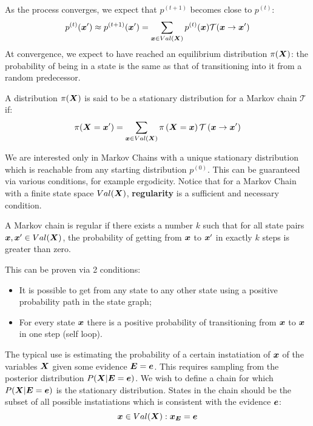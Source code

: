 As the process converges, we expect that $p^{(t+1)}$ becomes close to $p^{(t)}$:
\[p^{(t)}(\bm{x}')\approx p^{(t+1)}(\bm{x}')=\displaystyle\sum_{\bm{x}\in Val(\bm{X})}p^{(t)}(\bm{x})\mathcal{T}(\bm{x}\rightarrow\bm{x}')\]
At convergence, we expect to have reached an equilibrium distribution $\pi(\bm{X})$: the probability of being in a state is the same as that of transitioning into it from a random predecessor.
\begin{definition}
  A distribution $\pi(\bm{X})$ is said to be a stationary distribution for a Markov chain $\mathcal{T}$ if:
  \[\pi(\bm{X}=\bm{x}')=\displaystyle\sum_{\bm{x}\in Val(\bm{X})}\pi\left(\bm{X}=\bm{x}\right)\mathcal{T}\left(\bm{x}\rightarrow\bm{x}'\right)\]
\end{definition}
We are interested only in Markov Chains with a unique stationary distribution which is reachable from any starting distribution $p^{(0)}$. This can be guaranteed via various conditions, for example ergodicity. Notice that for a Markov Chain with a finite state space $Val(\bm{X})$, \textbf{regularity} is a sufficient and necessary condition. 
\begin{definition}[Regularity]
  A Markov chain is regular if there exists a number $k$ such that for all state pairs $\bm{x},\bm{x}'\in Val(\bm{X})$, the probability of getting from $\bm{x}$ to $\bm{x}'$ in exactly $k$ steps is greater than zero.  
\end{definition}
This can be proven via 2 conditions:
\begin{itemize}
  \item It is possible to get from any state to any other state using a positive probability path in the state graph;
  \item For every state $\bm{x}$ there is a positive probability of transitioning from $\bm{x}$ to $\bm{x}$ in one step (self loop).
\end{itemize}
The typical use is estimating the probability of a certain instatiation of $\bm{x}$ of the variables $\bm{X}$ given some evidence $\bm{E}=\bm{e}$. This requires sampling from the posterior distribution $P(\bm{X}\vert\bm{E}=\bm{e})$. We wish to define a chain for which $P(\bm{X}\vert\bm{E}=\bm{e})$ is the stationary distribution. \newline
States in the chain should be the subset of all possible instatiations which is consistent with the evidence $\bm{e}$:
\[\bm{x}\in Val(\bm{X}):\bm{x}_{\bm{E}}=\bm{e}\]
